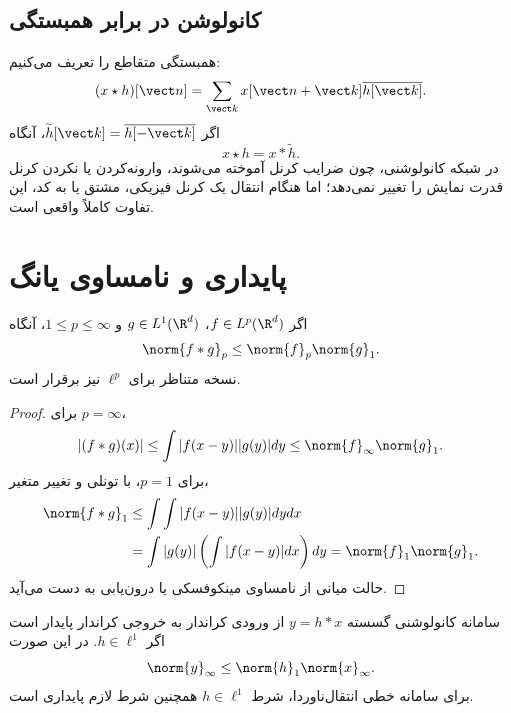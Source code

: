 \subsection{کانولوشن در برابر همبستگی}
همبستگی متقاطع را تعریف می‌کنیم:
\begin{equation}
(x\star h)[\vect n]=\sum_{\vect k}x[\vect n+\vect k]\overline{h[\vect k]}.
\end{equation}
اگر \(\widetilde h[\vect k]=\overline{h[-\vect k]}\)، آنگاه
\begin{equation}
x\star h=x*\widetilde h.
\end{equation}
در شبکه کانولوشنی، چون ضرایب کرنل آموخته می‌شوند، وارونه‌کردن یا نکردن کرنل قدرت نمایش را تغییر نمی‌دهد؛
اما هنگام انتقال یک کرنل فیزیکی، مشتق یا  به کد، این تفاوت کاملاً واقعی است.

\section{پایداری و نامساوی یانگ}

\begin{theorem}
اگر \(f\in L^p(\R^d)\)، \(g\in L^1(\R^d)\) و \(1\le p\le\infty\)، آنگاه
\begin{equation}
\norm{f*g}_p\le \norm{f}_p\norm{g}_1.
\label{eq:young}
\end{equation}
نسخه متناظر برای \(\ell^p\) نیز برقرار است.
\end{theorem}

\begin{proof}
برای \(p=\infty\)،
\begin{equation}
|(f*g)(x)|\le\int|f(x-y)||g(y)|dy
\le\norm{f}_\infty\norm{g}_1.
\end{equation}
برای \(p=1\)، با تونلی و تغییر متغیر،
\begin{align}
\norm{f*g}_1
&\le\int\int|f(x-y)||g(y)|dydx\\
&=\int|g(y)|\left(\int|f(x-y)|dx\right)dy
=\norm{f}_1\norm{g}_1.
\end{align}
حالت میانی از نامساوی مینکوفسکی یا درون‌یابی به دست می‌آید.
\end{proof}

\begin{corollary}
سامانه کانولوشنی گسسته \(y=h*x\) از ورودی کراندار به خروجی کراندار پایدار است اگر
\(h\in\ell^1\). در این صورت
\begin{equation}
\norm{y}_\infty\le\norm{h}_1\norm{x}_\infty.
\end{equation}
برای سامانه خطی انتقال‌ناوردا، شرط \(h\in\ell^1\) همچنین شرط لازم پایداری  است.
\end{corollary}

